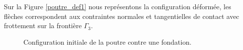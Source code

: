 Sur la Figure \ref{poutre_def1} nous représentons la configuration déformée, les flèches correspondent aux contraintes normales et tangentielles de contact avec frottement sur la frontière $\Gamma_3$.\\
\begin{figure}[ht!]
	\begin{center}
	\end{center}
		\caption{Configuration initiale de la poutre contre une fondation.}
		\label{poutre_conf1}
\end{figure}

